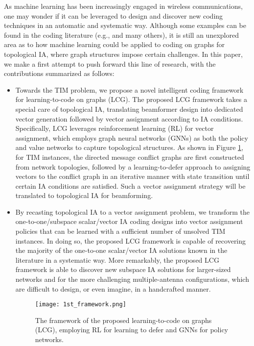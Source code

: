 \documentclass[a4paper,journal]{IEEEtran}
\begin{document}
As machine learning has been increasingly engaged in wireless communications, one may wonder if it can be leveraged to design and discover new coding techniques in an automatic and systematic way. Although some examples can be found in the coding literature (e.g., \cite{kim2020deepcode,chahine2021deepic,9517735} and many others), 
it is still an unexplored area as to how  
machine learning could be applied to coding on graphs for topological IA, where graph structures impose certain challenges.
% 
In this paper, we make a first attempt to push forward this line of research, with the contributions summarized as follows:
\begin{itemize}
    \item 
Towards the TIM problem, we propose a novel intelligent coding framework for learning-to-code on graphs (LCG). The proposed LCG framework takes a special care of topological IA, 
translating beamformer design into dedicated vector generation followed by vector assignment according to IA conditions.
Specifically, LCG
leverages reinforcement learning (RL) for vector assignment, which employs graph neural networks (GNNs) as both the policy and value networks to capture topological structures.
As shown in Figure \ref{1st_framework}, for TIM instances, the directed message conflict graphs are first constructed from network topologies, followed by a learning-to-defer approach to assigning vectors to the conflict graph in an iterative manner with state transition until certain IA conditions are satisfied. Such a vector assignment strategy will be translated to topological IA for beamforming.

\item
By recasting topological IA to a vector assignment problem, we transform the one-to-one/subspace scalar/vector IA coding designs into vector assignment policies that can be learned with a sufficient number of unsolved TIM instances. In doing so, the proposed LCG framework is capable of recovering the majority of the one-to-one scalar/vector IA solutions known in the literature in a systematic way.
More remarkably, the proposed LCG framework is able to discover new subspace IA solutions for larger-sized networks and for the more challenging multiple-antenna configurations, which are difficult to design, or even imagine, in a handcrafted manner.
\begin{figure}[t]
\begin{center}
   {%
     \texttt{[image: 1st\_framework.png]}}
\end{center}
   \caption{The framework of the proposed learning-to-code on graphs (LCG), employing RL for learning to defer and GNNs for policy networks.
   }
   \label{1st_framework}
\end{figure}



\end{itemize}
\end{document}

